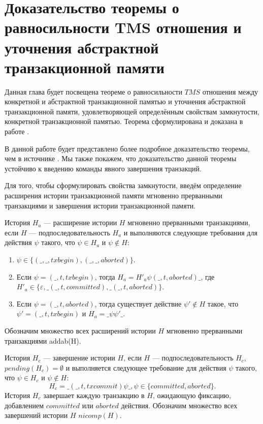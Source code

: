 \chapter{Доказательство теоремы о равносильности TMS отношения и уточнения абстрактной транзакционной памяти}
Данная глава будет посвещена теореме о равносильности $TMS$ отношения между конкретной и абстрактной транзакционной памятью и уточнения абстрактной транзакционной памяти, удовлетворяющей определённым свойствам замкнутости, конкретной транзакционной памятью. Теорема сформулирована и доказана в работе \cite{tms_article}.

В данной работе будет представлено более подробное доказательство теоремы, чем в источнике \cite{tms_article}. Мы также покажем, что доказательство данной теоремы \cite{tms_article} устойчиво к введению команды явного завершения транзакций. 

Для того, чтобы сформулировать свойства замкнутости, введём определение расширения  истории транзакционной памяти мгновенно прерванными транзакциями и завершения истории транзакционной памяти.  
\begin{mydefinition} История $H_a$ --- расширение истории $H$ мгновенно прерванными транзакциями, если $H$ --- подпоследовательность $H_a$ и выполняются следующие требования для действия $\psi$ такого, что $\psi \in H_a$ и $\psi \notin H$:
\begin{enumerate}[label=(\roman*)]
\item $\psi \in \{(\_, \_, txbegin), (\_, \_, aborted)\}$.
\item Если $\psi = (\_, t, txbegin)$, тогда $H_a = H'_a\psi(\_, t, aborted)\_$, где $H'_a \in \{\varepsilon, \_(\_, t, committed), \_(\_, t, aborted)\}$.
\item Если $\psi = (\_, t, aborted)$, тогда существует действие $\psi' \notin H$ такое, что $\psi' = (\_, t, txbegin)$ и $H_a = \_\psi\psi'\_$. 
\end{enumerate}
Обозначим множество всех расширений истории $H$ мгновенно прерванными транзакциями addab(H).
\end{mydefinition}

\begin{mydefinition} История $H_c$ --- завершение истории $H$, если $H$ --- подпоследовательность $H_c$, $pending(H_c) = \emptyset$ и выполняется следующее требование для действия $\psi$ такого, что $\psi \in H_c$ и $\psi \notin H$: $$H_c = \_(\_, t, txcommit)\psi\_, \psi \in \{committed, aborted\}.$$
История $H_c$ завершает каждую транзакцию в $H$, ожидающую фиксацию, добавлением $committed$ или $aborted$ действия. Обозначим множество всех завершений истории $H$ $nicomp(H)$.
\end{mydefinition}

